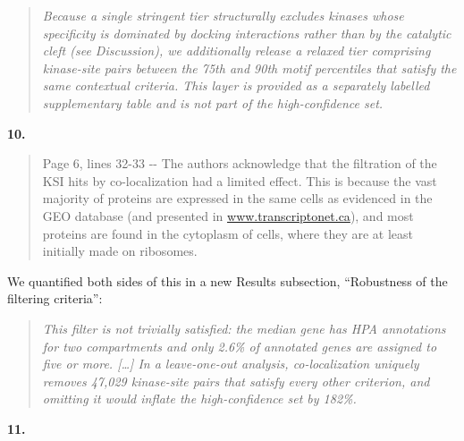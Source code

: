 \documentclass[
]{article}
\begin{document}
\begin{quote}
\emph{Because a single stringent tier structurally excludes kinases
whose specificity is dominated by docking interactions rather than by
the catalytic cleft (see Discussion), we additionally release a relaxed
tier comprising kinase-site pairs between the 75th and 90th motif
percentiles that satisfy the same contextual criteria. This layer is
provided as a separately labelled supplementary table and is not part of
the high-confidence set.}
\end{quote}

\textbf{10.}

\begin{quote}
Page 6, lines 32-33 -\/- The authors acknowledge that the filtration of
the KSI hits by co-localization had a limited effect. This is because
the vast majority of proteins are expressed in the same cells as
evidenced in the GEO database (and presented in
\href{http://www.transcriptonet.ca}{www.transcriptonet.ca}), and most
proteins are found in the cytoplasm of cells, where they are at least
initially made on ribosomes.
\end{quote}

We quantified both sides of this in a new Results subsection,
``Robustness of the filtering criteria'':

\begin{quote}
\emph{This filter is not trivially satisfied: the median gene has HPA
annotations for two compartments and only 2.6\% of annotated genes are
assigned to five or more. {[}\ldots{]} In a leave-one-out analysis,
co-localization uniquely removes 47,029 kinase-site pairs that satisfy
every other criterion, and omitting it would inflate the high-confidence
set by 182\%.}
\end{quote}

\textbf{11.}
\end{document}
